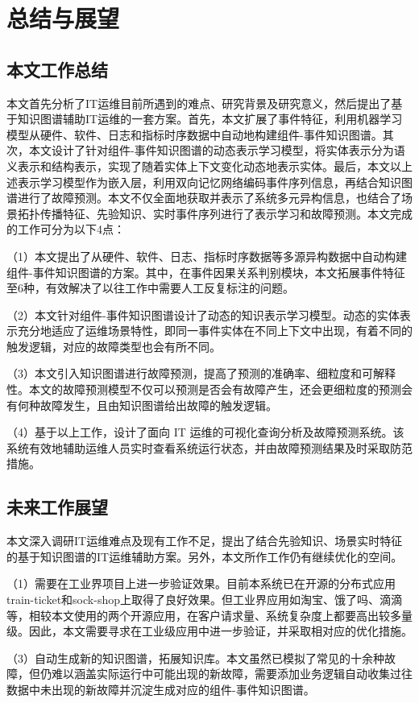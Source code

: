 \chapter{总结与展望}
\section{本文工作总结}
本文首先分析了IT运维目前所遇到的难点、研究背景及研究意义，然后提出了基于知识图谱辅助IT运维的一套方案。首先，本文扩展了事件特征，利用机器学习模型从硬件、软件、日志和指标时序数据中自动地构建组件-事件知识图谱。其次，本文设计了针对组件-事件知识图谱的动态表示学习模型，将实体表示分为语义表示和结构表示，实现了随着实体上下文变化动态地表示实体。最后，本文以上述表示学习模型作为嵌入层，利用双向记忆网络编码事件序列信息，再结合知识图谱进行了故障预测。本文不仅全面地获取并表示了系统多元异构信息，也结合了场景拓扑传播特征、先验知识、实时事件序列进行了表示学习和故障预测。本文完成的工作可分为以下4点：

（1）本文提出了从硬件、软件、日志、指标时序数据等多源异构数据中自动构建组件-事件知识图谱的方案。其中，在事件因果关系判别模块，本文拓展事件特征至6种，有效解决了以往工作中需要人工反复标注的问题。

（2）本文针对组件-事件知识图谱设计了动态的知识表示学习模型。动态的实体表示充分地适应了运维场景特性，即同一事件实体在不同上下文中出现，有着不同的触发逻辑，对应的故障类型也会有所不同。

（3）本文引入知识图谱进行故障预测，提高了预测的准确率、细粒度和可解释性。本文的故障预测模型不仅可以预测是否会有故障产生，还会更细粒度的预测会有何种故障发生，且由知识图谱给出故障的触发逻辑。

（4）基于以上工作，设计了面向 IT 运维的可视化查询分析及故障预测系统。该系统有效地辅助运维人员实时查看系统运行状态，并由故障预测结果及时采取防范措施。

\section{未来工作展望}
本文深入调研IT运维难点及现有工作不足，提出了结合先验知识、场景实时特征的基于知识图谱的IT运维辅助方案。另外，本文所作工作仍有继续优化的空间。

（1）需要在工业界项目上进一步验证效果。目前本系统已在开源的分布式应用train-ticket和sock-shop上取得了良好效果。但工业界应用如淘宝、饿了吗、滴滴等，相较本文使用的两个开源应用，在客户请求量、系统复杂度上都要高出较多量级。因此，本文需要寻求在工业级应用中进一步验证，并采取相对应的优化措施。

（3）自动生成新的知识图谱，拓展知识库。本文虽然已模拟了常见的十余种故障，但仍难以涵盖实际运行中可能出现的新故障，需要添加业务逻辑自动收集过往数据中未出现的新故障并沉淀生成对应的组件-事件知识图谱。